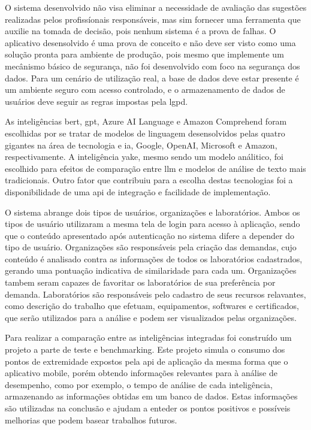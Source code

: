 O sistema desenvolvido não visa eliminar a necessidade de avaliação das sugestões realizadas pelos profissíonais responsáveis, mas sim fornecer uma ferramenta que auxilie na tomada de decisão, pois nenhum sistema é a prova de falhas. O aplicativo desensolvido é uma prova de conceito e não deve ser visto como uma solução pronta para ambiente de produção, pois mesmo que implemente um mecânismo básico de segurança, não foi desenvolvido com foco na segurança dos dados. Para um cenário de utilização real, a base de dados deve estar presente é um ambiente seguro com acesso controlado, e o armazenamento de dados de usuários deve seguir as regras impostas pela \gls{lgpd}.  

As inteligências \gls{bert}, \gls{gpt}, Azure AI Language e Amazon Comprehend foram escolhidas por se tratar de modelos de linguagem desensolvidos pelas quatro gigantes na área de tecnologia e \gls{ia}, Google, OpenAI, Microsoft e Amazon, respectivamente. A inteligência \gls{yake}, mesmo sendo um modelo análitico, foi escolhido para efeitos de comparação entre \gls{llm} e modelos de análise de texto mais tradicionais. Outro fator que contribuiu para a escolha destas tecnologias foi a disponibilidade de uma \gls{api} de integração e facilidade de implementação.

O sistema abrange dois tipos de usuários, organizações e laboratórios. Ambos os tipos de usuário utilizaram a mesma tela de login para acesso à aplicação, sendo que o conteúdo apresentado após autenticação no sistema difere a depender do tipo de usuário. Organizações são responsáveis pela criação das demandas, cujo conteúdo é analisado contra as informações de todos os laboratórios cadastrados, gerando uma pontuação indicativa de similaridade para cada um. Organizações tambem seram capazes de favoritar os laboratórios de sua preferência por demanda. Laboratórios são responsáveis pelo cadastro de seus recursos relavantes, como descrição do trabalho que efetuam, equipamentos, softwares e certificados, que serão utilizados para a análise e podem ser visualizados pelas organizações.

Para realizar a comparação entre as inteligências integradas foi construído um projeto a parte de teste e benchmarking. Este projeto simula o consumo dos pontos de extremidade expostos pela \gls{api} de aplicação da mesma forma que o aplicativo mobile, porém obtendo informações relevantes para à análise de desempenho, como por exemplo, o tempo de análise de cada inteligência, armazenando as informações obtidas em um banco de dados. Estas informações são utilizadas na conclusão e ajudam a enteder os pontos positivos e possíveis melhorias que podem basear trabalhos futuros.

